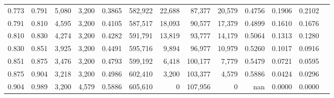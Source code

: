 \begin{tabular}{rrrrrrrrrrrrr}
0.773 & 0.791 &  5,080 & 3,200 &                                     0.3865 & 582,922 &  22,688 &  87,377 &  20,579 & 0.4756 & 0.1906 & 0.2102 \\
0.791 & 0.810 &  4,595 & 3,200 &                                     0.4105 & 587,517 &  18,093 &  90,577 &  17,379 & 0.4899 & 0.1610 & 0.1676 \\
0.810 & 0.830 &  4,274 & 3,200 &                                     0.4282 & 591,791 &  13,819 &  93,777 &  14,179 & 0.5064 & 0.1313 & 0.1280 \\
0.830 & 0.851 &  3,925 & 3,200 &                                     0.4491 & 595,716 &   9,894 &  96,977 &  10,979 & 0.5260 & 0.1017 & 0.0916 \\
0.851 & 0.875 &  3,476 & 3,200 &                                     0.4793 & 599,192 &   6,418 & 100,177 &   7,779 & 0.5479 & 0.0721 & 0.0595 \\
0.875 & 0.904 &  3,218 & 3,200 &                                     0.4986 & 602,410 &   3,200 & 103,377 &   4,579 & 0.5886 & 0.0424 & 0.0296 \\
0.904 & 0.989 &  3,200 & 4,579 &                                     0.5886 & 605,610 &       0 & 107,956 &       0 &    nan & 0.0000 & 0.0000 \\
\bottomrule
\end{tabular}

